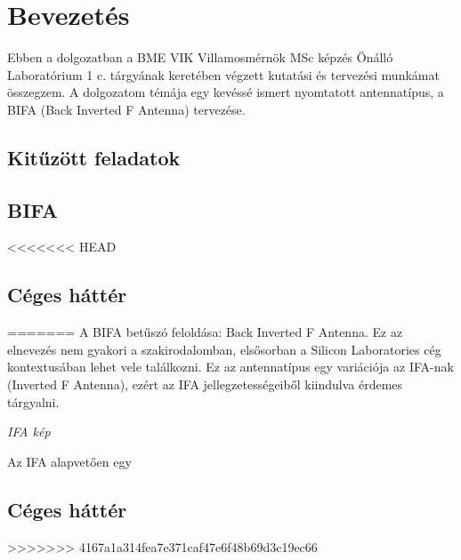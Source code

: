 \chapter{Bevezetés}
Ebben a dolgozatban a BME VIK Villamosmérnök MSc képzés Önálló Laboratórium 1 c. tárgyának keretében végzett kutatási és tervezési munkámat összegzem. A dolgozatom témája egy kevéssé ismert nyomtatott antennatípus, a BIFA (Back Inverted F Antenna) tervezése.
\section{Kitűzött feladatok}

\section{BIFA}
<<<<<<< HEAD

\section{Céges háttér}


=======
A BIFA betűszó feloldása: Back Inverted F Antenna. Ez az elnevezés nem gyakori a szakirodalomban, elsősorban a Silicon Laboratories cég kontextusában lehet vele találkozni. Ez az antennatípus egy variációja az IFA-nak (Inverted F Antenna), ezért az IFA jellegzetességeiből kiindulva érdemes tárgyalni.
\par
\begin{center}
\textit{IFA kép}
\end{center}
\par
Az IFA alapvetően egy 
\section{Céges háttér}
>>>>>>> 4167a1a314fea7e371caf47e6f48b69d3c19ec66

